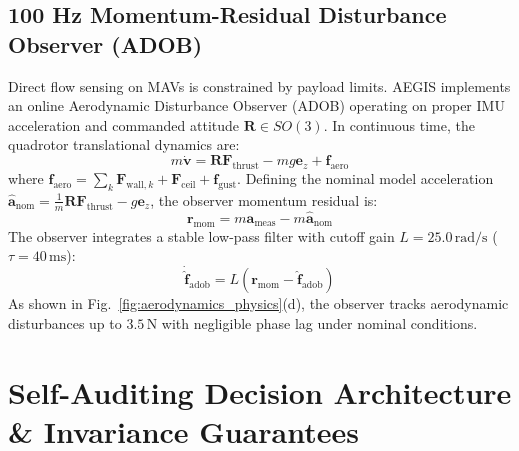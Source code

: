 \documentclass[11pt,a4paper]{article}
\begin{document}
\subsection{100 Hz Momentum-Residual Disturbance Observer (ADOB)}
Direct flow sensing on MAVs is constrained by payload limits. AEGIS implements an online Aerodynamic Disturbance Observer (ADOB) operating on proper IMU acceleration and commanded attitude $\mathbf{R} \in SO(3)$. In continuous time, the quadrotor translational dynamics are:
\begin{equation}
m \dot{\mathbf{v}} = \mathbf{R} \mathbf{F}_{\text{thrust}} - m g \mathbf{e}_z + \mathbf{f}_{\text{aero}}
\end{equation}
where $\mathbf{f}_{\text{aero}} = \sum_k \mathbf{F}_{\text{wall}, k} + \mathbf{F}_{\text{ceil}} + \mathbf{f}_{\text{gust}}$. Defining the nominal model acceleration $\hat{\mathbf{a}}_{\text{nom}} = \frac{1}{m} \mathbf{R} \mathbf{F}_{\text{thrust}} - g \mathbf{e}_z$, the observer momentum residual is:
\begin{equation}
\mathbf{r}_{\text{mom}} = m \mathbf{a}_{\text{meas}} - m \hat{\mathbf{a}}_{\text{nom}}
\end{equation}
The observer integrates a stable low-pass filter with cutoff gain $L = 25.0\,\text{rad/s}$ ($\tau = 40\,\text{ms}$):
\begin{equation}
\dot{\hat{\mathbf{f}}}_{\text{adob}} = L \left( \mathbf{r}_{\text{mom}} - \hat{\mathbf{f}}_{\text{adob}} \right)
\label{eq:adob_filter}
\end{equation}
As shown in Fig.~\ref{fig:aerodynamics_physics}(d), the observer tracks aerodynamic disturbances up to $3.5\,$N with negligible phase lag under nominal conditions.

\section{\texorpdfstring{Self-Auditing Decision Architecture \& Invariance Guarantees}{Self-Auditing Decision Architecture and Invariance Guarantees}}
\label{sec:architecture}
\end{document}
